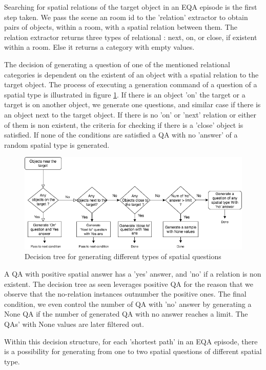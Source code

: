 Searching for spatial relations of the target object in an EQA episode is the first step taken. We pass the scene an room id to the 'relation' extractor to obtain pairs of objects, within a room,  with a spatial relation between them. The relation extractor returns three types of relational : next, on, or close, if existent within a room. Else it returns a category with empty values. 

The decision of generating a question of one of the mentioned relational categories is dependent on the existent of an object with a spatial relation to the target object. The process of executing a generation command of a question of a spatial type is illustrated in figure \ref{fig:spatial}. If there is an object 'on' the target or a target is on another object, we generate one questions, and similar case if there is an object next to the target object. If there is no 'on' or 'next' relation or either of them is non existent, the criteria for checking if there is a 'close' object is satisfied. If none of the conditions are satisfied a QA with no 'answer' of a random spatial type is generated.   

\begin{figure}[h]
\includegraphics[scale=0.4]{images/spatialconditions.png} %
\caption{Decision tree for generating different types of spatial questions}
\label{fig:spatial}
\end{figure}

A QA with positive spatial answer has a 'yes' answer, and 'no' if a relation is non existent. The decision tree as seen \label{fig:spatial} leverages positive QA for the reason that we observe that the no-relation instances outnumber the positive ones. The final condition, we even control the number of QA with 'no' answer by generating a None QA if the number of generated QA with no answer reaches a limit. The QAs' with None values are later filtered out.

Within this decision structure, for each 'shortest path' in an EQA episode, there is a possibility for generating from one to two spatial questions of different spatial type. 

